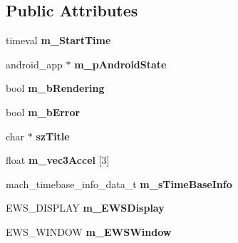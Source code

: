 \subsection*{Public Attributes}
\begin{DoxyCompactItemize}
\item 
\hypertarget{class_p_v_r_shell_init_o_s_add45d5ac514b66a91902905e09ce0617}{timeval {\bfseries m\+\_\+\+Start\+Time}}\label{class_p_v_r_shell_init_o_s_add45d5ac514b66a91902905e09ce0617}

\item 
\hypertarget{class_p_v_r_shell_init_o_s_ab2b1f0cac5d9d02f009315d1243b4bca}{android\+\_\+app $\ast$ {\bfseries m\+\_\+p\+Android\+State}}\label{class_p_v_r_shell_init_o_s_ab2b1f0cac5d9d02f009315d1243b4bca}

\item 
\hypertarget{class_p_v_r_shell_init_o_s_a1816fbdf5b78ec0983d74f77378a3301}{bool {\bfseries m\+\_\+b\+Rendering}}\label{class_p_v_r_shell_init_o_s_a1816fbdf5b78ec0983d74f77378a3301}

\item 
\hypertarget{class_p_v_r_shell_init_o_s_a9bd01dfa0abb98a4daae7d612b079c05}{bool {\bfseries m\+\_\+b\+Error}}\label{class_p_v_r_shell_init_o_s_a9bd01dfa0abb98a4daae7d612b079c05}

\item 
\hypertarget{class_p_v_r_shell_init_o_s_a15f464968bea62cec8cda4a0627fc4fa}{char $\ast$ {\bfseries sz\+Title}}\label{class_p_v_r_shell_init_o_s_a15f464968bea62cec8cda4a0627fc4fa}

\item 
\hypertarget{class_p_v_r_shell_init_o_s_ae6ab666954452f94158ad6344c16c03d}{float {\bfseries m\+\_\+vec3\+Accel} \mbox{[}3\mbox{]}}\label{class_p_v_r_shell_init_o_s_ae6ab666954452f94158ad6344c16c03d}

\item 
\hypertarget{class_p_v_r_shell_init_o_s_a441e71ef11667a07170f4801a4bc56a1}{mach\+\_\+timebase\+\_\+info\+\_\+data\+\_\+t {\bfseries m\+\_\+s\+Time\+Base\+Info}}\label{class_p_v_r_shell_init_o_s_a441e71ef11667a07170f4801a4bc56a1}

\item 
\hypertarget{class_p_v_r_shell_init_o_s_a3e5c16419df17d8c1684b17344ab8008}{E\+W\+S\+\_\+\+D\+I\+S\+P\+L\+A\+Y {\bfseries m\+\_\+\+E\+W\+S\+Display}}\label{class_p_v_r_shell_init_o_s_a3e5c16419df17d8c1684b17344ab8008}

\item 
\hypertarget{class_p_v_r_shell_init_o_s_a0d5cdc78a82ae37feb8322ee75349ce9}{E\+W\+S\+\_\+\+W\+I\+N\+D\+O\+W {\bfseries m\+\_\+\+E\+W\+S\+Window}}\label{class_p_v_r_shell_init_o_s_a0d5cdc78a82ae37feb8322ee75349ce9}


\end{DoxyCompactItemize}
